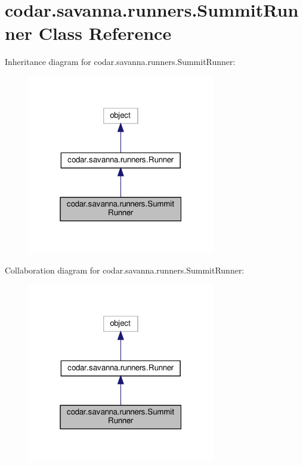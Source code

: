 \hypertarget{classcodar_1_1savanna_1_1runners_1_1_summit_runner}{}\section{codar.\+savanna.\+runners.\+Summit\+Runner Class Reference}
\label{classcodar_1_1savanna_1_1runners_1_1_summit_runner}


Inheritance diagram for codar.\+savanna.\+runners.\+Summit\+Runner\+:
\nopagebreak
\begin{figure}[H]
\begin{center}
\leavevmode
\includegraphics[width=232pt]{classcodar_1_1savanna_1_1runners_1_1_summit_runner__inherit__graph}
\end{center}
\end{figure}


Collaboration diagram for codar.\+savanna.\+runners.\+Summit\+Runner\+:
\nopagebreak
\begin{figure}[H]
\begin{center}
\leavevmode
\includegraphics[width=232pt]{classcodar_1_1savanna_1_1runners_1_1_summit_runner__coll__graph}
\end{center}
\end{figure}
